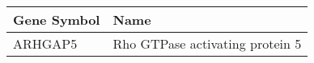\begin{tabular}{ll}
\toprule
Gene Symbol &                            Name \\
\midrule
    ARHGAP5 & Rho GTPase activating protein 5 \\
\bottomrule
\end{tabular}
